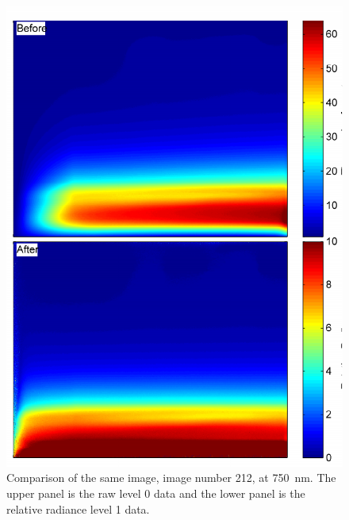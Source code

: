 \begin{figure}
\includegraphics[width=1.0\textwidth]{./Images/5-2-BeforeAfterImage.pdf}
    \caption[TODO:Write This]{Comparison of the same image, image number 212, at 750~nm. The upper panel is the raw level 0 data and the lower panel is the relative radiance level 1 data.}
    \label{fig:5.2:BeforeAfterImages}
\end{figure} 

